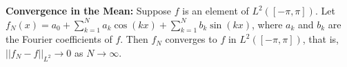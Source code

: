 {\bf Convergence in the Mean:} Suppose $f$ is an element of $L^2([-\pi,\pi])$. Let $f_N(x)=a_0+\sum_{k=1}^Na_k\cos(kx)+\sum_{k=1}^Nb_k\sin(kx)$, where $a_k$ and $b_k$ are the Fourier coefficients of $f$. Then $f_N$ converges to $f$ in $L^2([-\pi,\pi])$, that is, $\left|\left|f_N-f\right|\right|_{L^2}\rightarrow 0$ as $N\rightarrow\infty$.